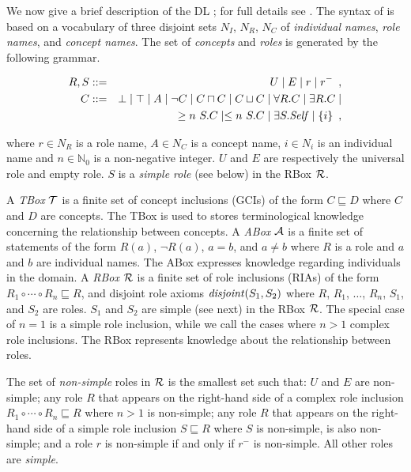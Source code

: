 \documentclass[
]{ceurart}
\begin{document}
We now give a brief description of the DL \SROIQ; for full details see \cite{baader_horrocks_lutz_sattler_2017,HorrocksKutzSattlerKR2006}. The syntax of \SROIQ is based on a vocabulary of three disjoint sets $N_I$, $N_R$, $N_C$ of \emph{individual names}, \emph{role names}, and \emph{concept names}. The set of \SROIQ \emph{concepts} and \emph{roles} is generated by the following grammar.

\begin{eqnarray*}
  R, S & ::= & U \mid E \mid r \mid r^{-} \enspace,\\
  C & ::= & \bot \mid \top \mid A \mid \neg C \mid C \sqcap C \mid C \sqcup C \mid \forall R.C \mid \exists R.C \mid \\ 
  & & \geq n~S.C \mid \leq n~S.C \mid \exists S.\mathit{Self} \mid \{i\} \enspace,
\end{eqnarray*}

where $r \in N_R$ is a role name, $A \in N_C$ is a concept name, $i \in N_i$ is an individual name and $n \in \mathbb{N}_0$ is a non-negative integer. $U$ and $E$ are respectively the universal role and empty role. $S$ is a \emph{simple role} (see below) in the RBox $\mathcal{R}$.

A \emph{TBox} $\mathcal{T}$ is a finite set of concept inclusions (GCIs) of the form $C \sqsubseteq D$ where $C$ and $D$ are concepts. The TBox is used to stores terminological knowledge concerning the relationship between concepts. A \emph{ABox} $\mathcal{A}$ is a finite set of statements of the form $R(a)$, $\lnot R (a)$, $a = b$, and $a \not= b$ where $R$ is a role and $a$ and $b$ are individual names. The ABox expresses knowledge regarding individuals in the domain. A \emph{RBox} $\mathcal{R}$ is a finite set of role inclusions (RIAs) of the form $R_1 \circ \cdots \circ R_n \sqsubseteq R$, and disjoint role axioms $\mathit{disjoint}(S_1, S_2)$ where $R$, $R_1$, $\dots$, $R_n$, $S_1$, and $S_2$ are roles. $S_1$ and $S_2$ are simple (see next) in the RBox $\mathcal{R}$. The special case of $n = 1$ is a simple role inclusion, while we call the cases where $n > 1$ complex role inclusions. The RBox represents knowledge about the relationship between roles.

The set of \emph{non-simple} roles in $\mathcal{R}$ is the smallest set such that: $U$ and $E$ are non-simple; any role $R$ that appears on the right-hand side of a complex role inclusion $R_1 \circ \cdots \circ R_n \sqsubseteq R$ where $n > 1$ is non-simple; any role $R$ that appears on the right-hand side of a simple role inclusion $S \sqsubseteq R$ where $S$ is non-simple, is also non-simple; and a role $r$ is non-simple if and only if $r^-$ is non-simple.
All other roles are \emph{simple}.
\end{document}
